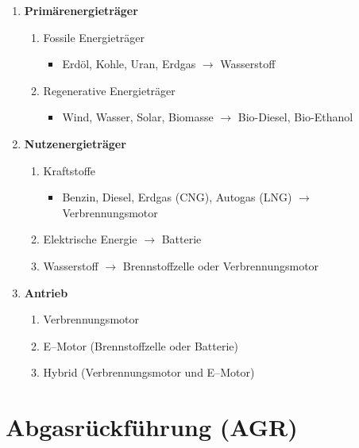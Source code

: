 \begin{enumerate}
\item
  \textbf{Primärenergieträger}

  \begin{enumerate}
  \def\labelenumii{\arabic{enumii}.}
  \item
    Fossile Energieträger

    \begin{itemize}
    \item
      Erdöl, Kohle, Uran, Erdgas $\to$ Wasserstoff
    \end{itemize}
  \item
    Regenerative Energieträger

    \begin{itemize}
    \item
      Wind, Wasser, Solar, Biomasse $\to$ Bio-Diesel, Bio-Ethanol
    \end{itemize}
  \end{enumerate}
\item
  \textbf{Nutzenergieträger}

  \begin{enumerate}
  \def\labelenumii{\arabic{enumii}.}
  \item
    Kraftstoffe

    \begin{itemize}
    \item
      Benzin, Diesel, Erdgas (CNG), Autogas (LNG) $\to$
      Verbrennungsmotor
    \end{itemize}
  \item
    Elektrische Energie $\to$ Batterie
  \item
    Wasserstoff $\to$ Brennstoffzelle oder Verbrennungsmotor
  \end{enumerate}
\item
  \textbf{Antrieb}

  \begin{enumerate}
  \def\labelenumii{\arabic{enumii}.}
  \item
    Verbrennungsmotor
  \item
    E--Motor (Brennstoffzelle oder Batterie)
  \item
    Hybrid (Verbrennungsmotor und E--Motor)
  \end{enumerate}
\end{enumerate}

\section{Abgasrückführung (AGR)}\label{abgasrueckfuehrung-agr}

